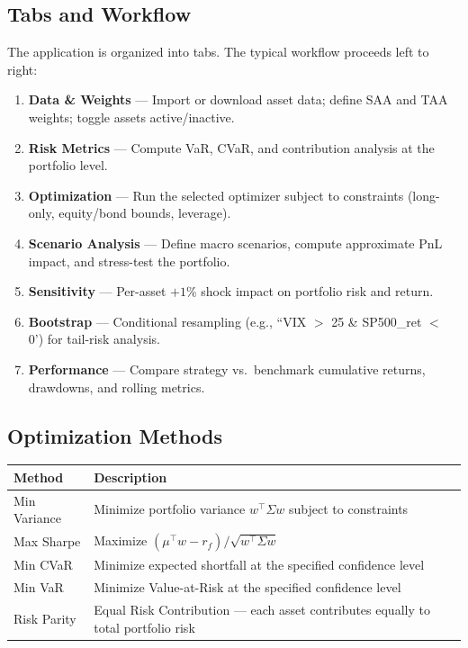 \documentclass[11pt,a4paper]{article}
\begin{document}
\subsection{Tabs and Workflow}
The application is organized into tabs. The typical workflow proceeds left to right:
\begin{enumerate}[leftmargin=2em]
  \item \textbf{Data \& Weights} --- Import or download asset data; define SAA and TAA weights; toggle assets active/inactive.
  \item \textbf{Risk Metrics} --- Compute VaR, CVaR, and contribution analysis at the portfolio level.
  \item \textbf{Optimization} --- Run the selected optimizer subject to constraints (long-only, equity/bond bounds, leverage).
  \item \textbf{Scenario Analysis} --- Define macro scenarios, compute approximate PnL impact, and stress-test the portfolio.
  \item \textbf{Sensitivity} --- Per-asset $+1$\% shock impact on portfolio risk and return.
  \item \textbf{Bootstrap} --- Conditional resampling (e.g., ``VIX $>$ 25 \& SP500\_ret $<$ 0') for tail-risk analysis.
  \item \textbf{Performance} --- Compare strategy vs.\ benchmark cumulative returns, drawdowns, and rolling metrics.
\end{enumerate}

\subsection{Optimization Methods}
\begin{center}
\begin{tabularx}{\textwidth}{l X}
\toprule
\textbf{Method} & \textbf{Description} \\
\midrule
Min Variance & Minimize portfolio variance $w^\top \Sigma w$ subject to constraints \\
Max Sharpe & Maximize $(\mu^\top w - r_f) / \sqrt{w^\top \Sigma w}$ \\
Min CVaR & Minimize expected shortfall at the specified confidence level \\
Min VaR & Minimize Value-at-Risk at the specified confidence level \\
Risk Parity & Equal Risk Contribution --- each asset contributes equally to total portfolio risk \\
\bottomrule
\end{tabularx}
\end{center}
\newpage
\end{document}

